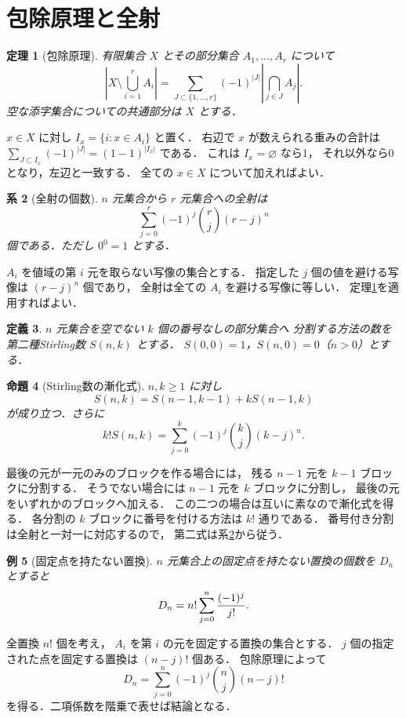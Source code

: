 \documentclass[a5paper,10pt,onecolumn]{jsarticle}
\makeatletter
\theoremstyle{mathnotetheorem}
\newtheorem{theorem}{定理}[section]
\newtheorem{definition}[theorem]{定義}
\newtheorem{proposition}[theorem]{命題}
\newtheorem{corollary}[theorem]{系}
\newtheorem{example}[theorem]{例}
\renewcommand{\proofname}{証明}
\renewenvironment{proof}[1][\proofname]{%
  \par\pushQED{\qed}\normalfont\topsep4\p@\@plus2\p@\relax
  \trivlist\item[\hskip\labelsep\bfseries #1]\ignorespaces
}{\popQED\endtrivlist\@endpefalse}
\makeatother
\begin{document}
\section{包除原理と全射}
\begin{theorem}[包除原理]\label{thm:ie}
有限集合 $X$ とその部分集合 $A_1,\ldots,A_r$ について
\[
 \left|X\setminus\bigcup_{i=1}^rA_i\right|
 =\sum_{J\subset\{1,\ldots,r\}}(-1)^{|J|}
 \left|\bigcap_{j\in J}A_j\right|.
\]
空な添字集合についての共通部分は $X$ とする．
\end{theorem}
\begin{proof}
$x\in X$ に対し $I_x=\{i:x\in A_i\}$ と置く．
右辺で $x$ が数えられる重みの合計は
$\sum_{J\subset I_x}(-1)^{|J|}=(1-1)^{|I_x|}$ である．
これは $I_x=\varnothing$ なら1，
それ以外なら0となり，左辺と一致する．
全ての $x\in X$ について加えればよい．
\end{proof}
\begin{corollary}[全射の個数]\label{cor:surj}
$n$ 元集合から $r$ 元集合への全射は
\[
 \sum_{j=0}^r(-1)^j{r\choose j}(r-j)^n
\]
個である．ただし $0^0=1$ とする．
\end{corollary}
\begin{proof}
$A_i$ を値域の第 $i$ 元を取らない写像の集合とする．
指定した $j$ 個の値を避ける写像は $(r-j)^n$ 個であり，
全射は全ての $A_i$ を避ける写像に等しい．
定理\ref{thm:ie}を適用すればよい．
\end{proof}

\begin{definition}
$n$ 元集合を空でない $k$ 個の番号なしの部分集合へ
分割する方法の数を第二種Stirling数 $S(n,k)$ とする．
$S(0,0)=1$，$S(n,0)=0$（$n>0$）とする．
\end{definition}
\begin{proposition}[Stirling数の漸化式]
$n,k\ge1$ に対し
\[
 S(n,k)=S(n-1,k-1)+kS(n-1,k)
\]
が成り立つ．さらに
\[
 k!S(n,k)=\sum_{j=0}^{k}(-1)^j{k\choose j}(k-j)^n.
\]
\end{proposition}
\begin{proof}
最後の元が一元のみのブロックを作る場合には，
残る $n-1$ 元を $k-1$ ブロックに分割する．
そうでない場合には $n-1$ 元を $k$ ブロックに分割し，
最後の元をいずれかのブロックへ加える．
この二つの場合は互いに素なので漸化式を得る．
各分割の $k$ ブロックに番号を付ける方法は $k!$ 通りである．
番号付き分割は全射と一対一に対応するので，
第二式は系\ref{cor:surj}から従う．
\end{proof}
\begin{example}[固定点を持たない置換]
$n$ 元集合上の固定点を持たない置換の個数を $D_n$ とすると
\[
 D_n=n!\sum_{j=0}^n{(-1)^j\over j!}.
\]
\end{example}
\begin{proof}
全置換 $n!$ 個を考え，
$A_i$ を第 $i$ の元を固定する置換の集合とする．
$j$ 個の指定された点を固定する置換は $(n-j)!$ 個ある．
包除原理によって
\[
 D_n=\sum_{j=0}^n(-1)^j{n\choose j}(n-j)!
\]
を得る．二項係数を階乗で表せば結論となる．
\end{proof}
\end{document}
